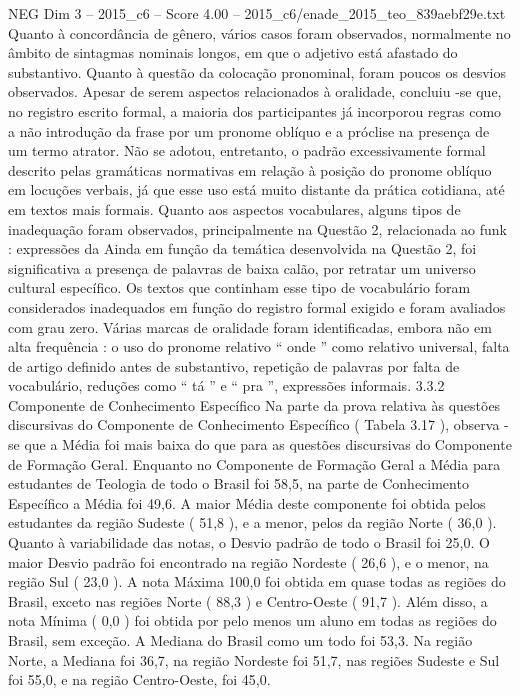 \begin{textsample}{NEG Dim 3 – 2015\_c6 – Score 4.00 – 2015\_c6/enade\_2015\_teo\_839aebf29e.txt}
Quanto à concordância de gênero, vários casos foram observados, normalmente no âmbito de sintagmas nominais longos, em que o adjetivo está afastado do substantivo.
Quanto à questão da colocação pronominal, foram poucos os desvios observados.
Apesar de serem aspectos relacionados à oralidade, concluiu -se que, no registro escrito formal, a maioria dos participantes já incorporou regras como a não introdução da frase por um pronome oblíquo e a próclise na presença de um termo atrator.
Não se adotou, entretanto, o padrão excessivamente formal descrito pelas gramáticas normativas em relação à posição do pronome oblíquo em locuções verbais, já que esse uso está muito distante da prática cotidiana, até em textos mais formais.
Quanto aos aspectos vocabulares, alguns tipos de inadequação foram observados, principalmente na Questão 2, relacionada ao funk : expressões da Ainda em função da temática desenvolvida na Questão 2, foi significativa a presença de palavras de baixa calão, por retratar um universo cultural específico.
Os textos que continham esse tipo de vocabulário foram considerados inadequados em função do registro formal exigido e foram avaliados com grau zero.
Várias marcas de oralidade foram identificadas, embora não em alta frequência : o uso do pronome relativo “ onde ” como relativo universal, falta de artigo definido antes de substantivo, repetição de palavras por falta de vocabulário, reduções como “ tá ” e “ pra ”, expressões informais. 3.3.2 Componente de Conhecimento Específico Na parte da prova relativa às questões discursivas do Componente de Conhecimento Específico ( Tabela 3.17 ), observa -se que a Média foi mais baixa do que para as questões discursivas do Componente de Formação Geral.
Enquanto no Componente de Formação Geral a Média para estudantes de Teologia de todo o Brasil foi 58,5, na parte de Conhecimento Específico a Média foi 49,6.
A maior Média deste componente foi obtida pelos estudantes da região Sudeste ( 51,8 ), e a menor, pelos da região Norte ( 36,0 ).
Quanto à variabilidade das notas, o Desvio padrão de todo o Brasil foi 25,0.
O maior Desvio padrão foi encontrado na região Nordeste ( 26,6 ), e o menor, na região Sul ( 23,0 ).
A nota Máxima 100,0 foi obtida em quase todas as regiões do Brasil, exceto nas regiões Norte ( 88,3 ) e Centro-Oeste ( 91,7 ).
Além disso, a nota Mínima ( 0,0 ) foi obtida por pelo menos um aluno em todas as regiões do Brasil, sem exceção.
A Mediana do Brasil como um todo foi 53,3.
Na região Norte, a Mediana foi 36,7, na região Nordeste foi 51,7, nas regiões Sudeste e Sul foi 55,0, e na região Centro-Oeste, foi 45,0.

\end{textsample}
